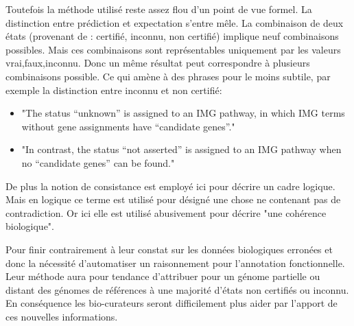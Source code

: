 \begin{refsegment}
Toutefois la méthode utilisé reste assez flou d'un point de vue formel. La distinction entre prédiction et expectation s'entre mêle. La combinaison de deux états (provenant de : certifié, inconnu, non certifié) implique neuf combinaisons possibles. Mais ces combinaisons sont représentables uniquement par les valeurs vrai,faux,inconnu. Donc un même résultat peut correspondre à plusieurs combinaisons possible. Ce qui amène à des phrases pour le moins subtile, par exemple la distinction entre inconnu et non certifié:
\begin{itemize}
    \item "The status “unknown” is assigned to an IMG pathway, in which IMG terms without gene assignments have “candidate genes”."
    \item "In contrast, the status “not asserted” is assigned to an IMG pathway when no “candidate genes” can be found."
\end{itemize}

De plus la notion de consistance est employé ici pour décrire un cadre logique. Mais en logique ce terme est utilisé pour désigné une chose ne contenant pas de contradiction. Or ici elle est utilisé abusivement pour décrire "une cohérence biologique".

Pour finir contrairement à leur constat sur les données biologiques erronées et donc la nécessité d'automatiser un raisonnement pour l'annotation fonctionnelle. Leur méthode aura pour tendance d'attribuer pour un génome partielle ou distant des génomes de références à une majorité d'états non certifiés ou inconnu. En conséquence les bio-curateurs seront difficilement plus aider par l'apport de ces nouvelles informations.




\end{refsegment}
